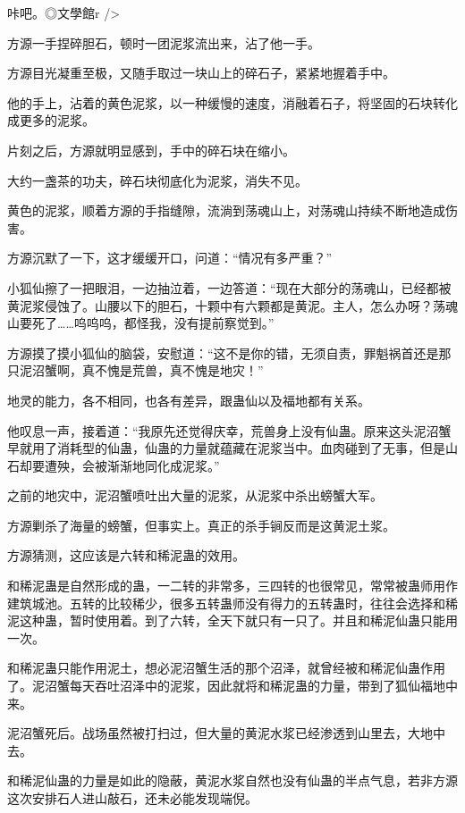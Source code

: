 
\begin{this_body}

咔吧。◎文學館r />

方源一手捏碎胆石，顿时一团泥浆流出来，沾了他一手。

方源目光凝重至极，又随手取过一块山上的碎石子，紧紧地握着手中。

他的手上，沾着的黄色泥浆，以一种缓慢的速度，消融着石子，将坚固的石块转化成更多的泥浆。

片刻之后，方源就明显感到，手中的碎石块在缩小。

大约一盏茶的功夫，碎石块彻底化为泥浆，消失不见。

黄色的泥浆，顺着方源的手指缝隙，流淌到荡魂山上，对荡魂山持续不断地造成伤害。

方源沉默了一下，这才缓缓开口，问道：“情况有多严重？”

小狐仙擦了一把眼泪，一边抽泣着，一边答道：“现在大部分的荡魂山，已经都被黄泥浆侵蚀了。山腰以下的胆石，十颗中有六颗都是黄泥。主人，怎么办呀？荡魂山要死了……呜呜呜，都怪我，没有提前察觉到。”

方源摸了摸小狐仙的脑袋，安慰道：“这不是你的错，无须自责，罪魁祸首还是那只泥沼蟹啊，真不愧是荒兽，真不愧是地灾！”

地灵的能力，各不相同，也各有差异，跟蛊仙以及福地都有关系。

他叹息一声，接着道：“我原先还觉得庆幸，荒兽身上没有仙蛊。原来这头泥沼蟹早就用了消耗型的仙蛊，仙蛊的力量就蕴藏在泥浆当中。血肉碰到了无事，但是山石却要遭殃，会被渐渐地同化成泥浆。”

之前的地灾中，泥沼蟹喷吐出大量的泥浆，从泥浆中杀出螃蟹大军。

方源剿杀了海量的螃蟹，但事实上。真正的杀手锏反而是这黄泥土浆。

方源猜测，这应该是六转和稀泥蛊的效用。

和稀泥蛊是自然形成的蛊，一二转的非常多，三四转的也很常见，常常被蛊师用作建筑城池。五转的比较稀少，很多五转蛊师没有得力的五转蛊时，往往会选择和稀泥这种蛊，暂时使用着。到了六转，全天下就只有一只了。并且和稀泥仙蛊只能用一次。

和稀泥蛊只能作用泥土，想必泥沼蟹生活的那个沼泽，就曾经被和稀泥仙蛊作用了。泥沼蟹每天吞吐沼泽中的泥浆，因此就将和稀泥蛊的力量，带到了狐仙福地中来。

泥沼蟹死后。战场虽然被打扫过，但大量的黄泥水浆已经渗透到山里去，大地中去。

和稀泥仙蛊的力量是如此的隐蔽，黄泥水浆自然也没有仙蛊的半点气息，若非方源这次安排石人进山敲石，还未必能发现端倪。


\end{this_body}
